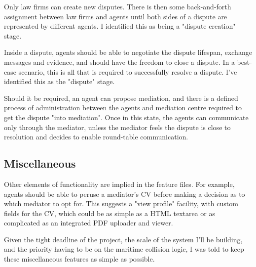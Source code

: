 Only law firms can create new disputes. There is then some back-and-forth assignment between law firms and agents until both sides of a dispute are represented by different agents. I identified this as being a "dispute creation" stage.

Inside a dispute, agents should be able to negotiate the dispute lifespan, exchange messages and evidence, and should have the freedom to close a dispute. In a best-case scenario, this is all that is required to successfully resolve a dispute. I've identified this as the "dispute" stage.

Should it be required, an agent can propose mediation, and there is a defined process of administration between the agents and mediation centre required to get the dispute "into mediation". Once in this state, the agents can communicate only through the mediator, unless the mediator feels the dispute is close to resolution and decides to enable round-table communication.

\subsection{Miscellaneous}

Other elements of functionality are implied in the feature files. For example, agents should be able to peruse a mediator's CV before making a decision as to which mediator to opt for. This suggests a "view profile" facility, with custom fields for the CV, which could be as simple as a HTML textarea or as complicated as an integrated PDF uploader and viewer.

Given the tight deadline of the project, the scale of the system I'll be building, and the priority having to be on the maritime collision logic, I was told to keep these miscellaneous features as simple as possible.

